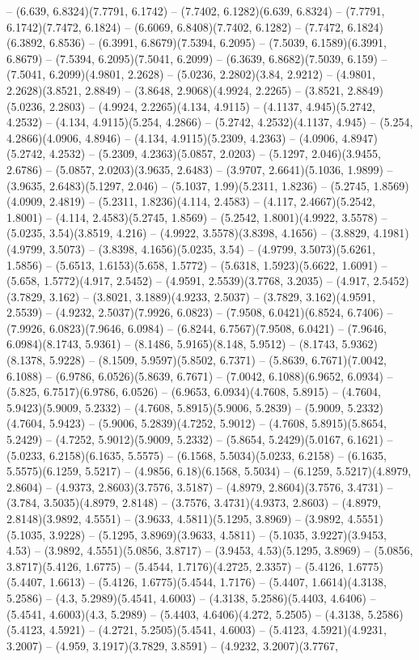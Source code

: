 -- (6.639, 6.8324)(7.7791, 6.1742) -- (7.7402, 6.1282)(6.639, 6.8324) -- (7.7791, 6.1742)(7.7472, 6.1824) -- (6.6069, 6.8408)(7.7402, 6.1282) -- (7.7472, 6.1824)(6.3892, 6.8536) -- (6.3991, 6.8679)(7.5394, 6.2095) -- (7.5039, 6.1589)(6.3991, 6.8679) -- (7.5394, 6.2095)(7.5041, 6.2099) -- (6.3639, 6.8682)(7.5039, 6.159) -- (7.5041, 6.2099)(4.9801, 2.2628) -- (5.0236, 2.2802)(3.84, 2.9212) -- (4.9801, 2.2628)(3.8521, 2.8849) -- (3.8648, 2.9068)(4.9924, 2.2265) -- (3.8521, 2.8849)(5.0236, 2.2803) -- (4.9924, 2.2265)(4.134, 4.9115) -- (4.1137, 4.945)(5.2742, 4.2532) -- (4.134, 4.9115)(5.254, 4.2866) -- (5.2742, 4.2532)(4.1137, 4.945) -- (5.254, 4.2866)(4.0906, 4.8946) -- (4.134, 4.9115)(5.2309, 4.2363) -- (4.0906, 4.8947)(5.2742, 4.2532) -- (5.2309, 4.2363)(5.0857, 2.0203) -- (5.1297, 2.046)(3.9455, 2.6786) -- (5.0857, 2.0203)(3.9635, 2.6483) -- (3.9707, 2.6641)(5.1036, 1.9899) -- (3.9635, 2.6483)(5.1297, 2.046) -- (5.1037, 1.99)(5.2311, 1.8236) -- (5.2745, 1.8569)(4.0909, 2.4819) -- (5.2311, 1.8236)(4.114, 2.4583) -- (4.117, 2.4667)(5.2542, 1.8001) -- (4.114, 2.4583)(5.2745, 1.8569) -- (5.2542, 1.8001)(4.9922, 3.5578) -- (5.0235, 3.54)(3.8519, 4.216) -- (4.9922, 3.5578)(3.8398, 4.1656) -- (3.8829, 4.1981)(4.9799, 3.5073) -- (3.8398, 4.1656)(5.0235, 3.54) -- (4.9799, 3.5073)(5.6261, 1.5856) -- (5.6513, 1.6153)(5.658, 1.5772) -- (5.6318, 1.5923)(5.6622, 1.6091) -- (5.658, 1.5772)(4.917, 2.5452) -- (4.9591, 2.5539)(3.7768, 3.2035) -- (4.917, 2.5452)(3.7829, 3.162) -- (3.8021, 3.1889)(4.9233, 2.5037) -- (3.7829, 3.162)(4.9591, 2.5539) -- (4.9232, 2.5037)(7.9926, 6.0823) -- (7.9508, 6.0421)(6.8524, 6.7406) -- (7.9926, 6.0823)(7.9646, 6.0984) -- (6.8244, 6.7567)(7.9508, 6.0421) -- (7.9646, 6.0984)(8.1743, 5.9361) -- (8.1486, 5.9165)(8.148, 5.9512) -- (8.1743, 5.9362)(8.1378, 5.9228) -- (8.1509, 5.9597)(5.8502, 6.7371) -- (5.8639, 6.7671)(7.0042, 6.1088) -- (6.9786, 6.0526)(5.8639, 6.7671) -- (7.0042, 6.1088)(6.9652, 6.0934) -- (5.825, 6.7517)(6.9786, 6.0526) -- (6.9653, 6.0934)(4.7608, 5.8915) -- (4.7604, 5.9423)(5.9009, 5.2332) -- (4.7608, 5.8915)(5.9006, 5.2839) -- (5.9009, 5.2332)(4.7604, 5.9423) -- (5.9006, 5.2839)(4.7252, 5.9012) -- (4.7608, 5.8915)(5.8654, 5.2429) -- (4.7252, 5.9012)(5.9009, 5.2332) -- (5.8654, 5.2429)(5.0167, 6.1621) -- (5.0233, 6.2158)(6.1635, 5.5575) -- (6.1568, 5.5034)(5.0233, 6.2158) -- (6.1635, 5.5575)(6.1259, 5.5217) -- (4.9856, 6.18)(6.1568, 5.5034) -- (6.1259, 5.5217)(4.8979, 2.8604) -- (4.9373, 2.8603)(3.7576, 3.5187) -- (4.8979, 2.8604)(3.7576, 3.4731) -- (3.784, 3.5035)(4.8979, 2.8148) -- (3.7576, 3.4731)(4.9373, 2.8603) -- (4.8979, 2.8148)(3.9892, 4.5551) -- (3.9633, 4.5811)(5.1295, 3.8969) -- (3.9892, 4.5551)(5.1035, 3.9228) -- (5.1295, 3.8969)(3.9633, 4.5811) -- (5.1035, 3.9227)(3.9453, 4.53) -- (3.9892, 4.5551)(5.0856, 3.8717) -- (3.9453, 4.53)(5.1295, 3.8969) -- (5.0856, 3.8717)(5.4126, 1.6775) -- (5.4544, 1.7176)(4.2725, 2.3357) -- (5.4126, 1.6775)(5.4407, 1.6613) -- (5.4126, 1.6775)(5.4544, 1.7176) -- (5.4407, 1.6614)(4.3138, 5.2586) -- (4.3, 5.2989)(5.4541, 4.6003) -- (4.3138, 5.2586)(5.4403, 4.6406) -- (5.4541, 4.6003)(4.3, 5.2989) -- (5.4403, 4.6406)(4.272, 5.2505) -- (4.3138, 5.2586)(5.4123, 4.5921) -- (4.2721, 5.2505)(5.4541, 4.6003) -- (5.4123, 4.5921)(4.9231, 3.2007) -- (4.959, 3.1917)(3.7829, 3.8591) -- (4.9232, 3.2007)(3.7767, 